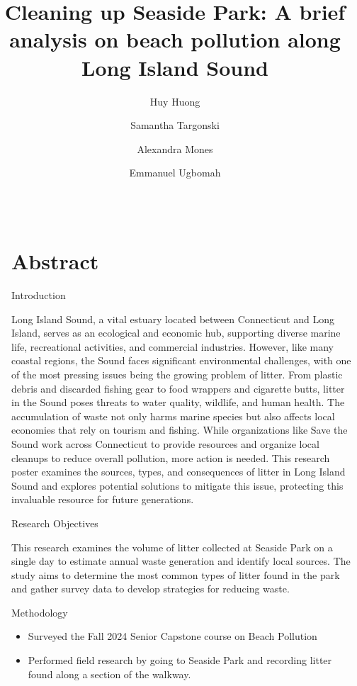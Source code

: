\documentclass[final]{beamer}
\title{Cleaning up Seaside Park: A brief analysis on beach pollution along Long Island Sound}
\author{Huy Huong\inst{1} \and Samantha Targonski\inst{1} \and Alexandra Mones\inst{2} \and Emmanuel Ugbomah\inst{2}}
\institute[UB]{HONR-390/CAPS-390 Senior Capstone --- Island of Misfits}
\newlength{\sepwidth}
\newlength{\colwidth}
\newcommand{\separatorcolumn}{\begin{column}{\sepwidth}\end{column}}
\begin{document}
  \begin{frame}[t]
    \begin{columns}[t]
      \separatorcolumn

      \begin{column}{\colwidth}
        \section{Abstract}
        \begin{block}{Introduction}

          Long Island Sound, a vital estuary located between Connecticut and Long Island, serves as an ecological and economic hub, supporting diverse marine life, recreational activities, and commercial industries. However, like many coastal regions, the Sound faces significant environmental challenges, with one of the most pressing issues being the growing problem of litter. From plastic debris and discarded fishing gear to food wrappers and cigarette butts, litter in the Sound poses threats to water quality, wildlife, and human health. The accumulation of waste not only harms marine species but also affects local economies that rely on tourism and fishing. While organizations like Save the Sound \cite{STS_CT_Cleanup} work across Connecticut to provide resources and organize local cleanups to reduce overall pollution, more action is needed. This research poster examines the sources, types, and consequences of litter in Long Island Sound and explores potential solutions to mitigate this issue, protecting this invaluable resource for future generations.

        \end{block}

        \begin{block}{Research Objectives}

          This research examines the volume of litter collected at Seaside Park on a single day to estimate annual waste generation and identify local sources. The study aims to determine the most common types of litter found in the park and gather survey data to develop strategies for reducing waste.

        \end{block}

        \begin{block}{Methodology}
            \begin{itemize}
              \item Surveyed the Fall 2024 Senior Capstone course on Beach Pollution
              \item Performed field research by going to Seaside Park and recording litter found along a section of the walkway.
            \end{itemize}


\end{block}
\end{column}
\end{columns}
\end{frame}
\end{document}
